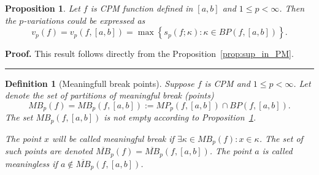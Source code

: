 \documentclass[12pt, a4paper]{article}
\newtheorem{proposition}[theorem]{Proposition}
\newtheorem{definition}[theorem]{Definition}
\newenvironment{proof}[1][Proof]{\noindent \textbf{#1.} }{\  \rule{0.5em}{0.5em}}
\numberwithin{equation}{section}
\begin{document}
 
  
\begin{proposition}\label{prop:pvar-max}
  Let $f$ is CPM function defined in $[a,b]$ and $1 \leq p < \infty$.
  Then the $p$-variations could be expressed as 
  \begin{equation}
    v_{p}\left( f\right) =v_{p}\left( f,[a,b]\right) =\max \left\{
    s_{p}(f;\kappa ):\kappa \in BP(f,[a,b]) \right\}.
  \label{pv1}
  \end{equation}
\end{proposition}
\begin{proof}
  This result follows directly from the Proposition~\ref{prop:sup_in_PM}.
\end{proof} 




\begin{definition}[Meaningfull break points]\label{def:MB} 
  Suppose $f$ is CPM and $1 \leq p < \infty$. 
  Let denote the set of \emph{partitions of meaningful break} (points)
  \begin{equation}
    MB_{p}(f) = MB_{p}(f,[a,b]):= MP_p(f,[a,b]) \cap BP(f, [a,b]).
  \end{equation}  
  The set $MB_{p}(f,[a,b])$ is not empty according to Proposition~\ref{prop:pvar-max}.
  
  The point $x$ will be called \emph{meaningful break} if $\exists \kappa \in MB_{p}(f): x \in \kappa$.
  The set of such points are denoted $\overline{MB}_p(f) = \overline{MB}_p(f,[a,b])$.
  The point $a$ is called \emph{meaningless} if 
  $a \notin \overline{MB}_{p}(f,[a,b]) $. 
\end{definition}
\end{document}
